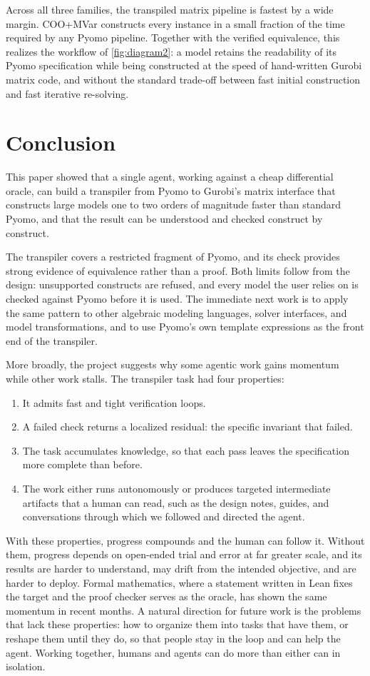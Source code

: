 \documentclass[runningheads]{llncs}
\begin{document}
Across all three families, the transpiled matrix pipeline is fastest by a wide margin. COO+MVar constructs every instance in a small fraction of the time required by any Pyomo pipeline. Together with the verified equivalence, this realizes the workflow of \autoref{fig:diagram2}: a model retains the readability of its Pyomo specification while being constructed at the speed of hand-written Gurobi matrix code, and without the standard trade-off between fast initial construction and fast iterative re-solving.



\section{Conclusion}
\label{sec:conclusion}

This paper showed that a single agent, working against a cheap differential oracle, can build a transpiler from Pyomo to Gurobi's matrix interface that constructs large models one to two orders of magnitude faster than standard Pyomo, and that the result can be understood and checked construct by construct.

The transpiler covers a restricted fragment of Pyomo, and its check provides strong evidence of equivalence rather than a proof. Both limits follow from the design: unsupported constructs are refused, and every model the user relies on is checked against Pyomo before it is used. The immediate next work is to apply the same pattern to other algebraic modeling languages, solver interfaces, and model transformations, and to use Pyomo's own template expressions as the front end of the transpiler.

More broadly, the project suggests why some agentic work gains momentum while other work stalls. The transpiler task had four properties:
\begin{enumerate}
\item It admits fast and tight verification loops.
\item A failed check returns a localized residual: the specific invariant that failed.
\item The task accumulates knowledge, so that each pass leaves the specification more complete than before.
\item The work either runs autonomously or produces targeted intermediate artifacts that a human can read, such as the design notes, guides, and conversations through which we followed and directed the agent.
\end{enumerate}
With these properties, progress compounds and the human can follow it. Without them, progress depends on open-ended trial and error at far greater scale, and its results are harder to understand, may drift from the intended objective, and are harder to deploy. Formal mathematics, where a statement written in Lean fixes the target and the proof checker serves as the oracle, has shown the same momentum in recent months. A natural direction for future work is the problems that lack these properties: how to organize them into tasks that have them, or reshape them until they do, so that people stay in the loop and can help the agent. Working together, humans and agents can do more than either can in isolation.
\end{document}
